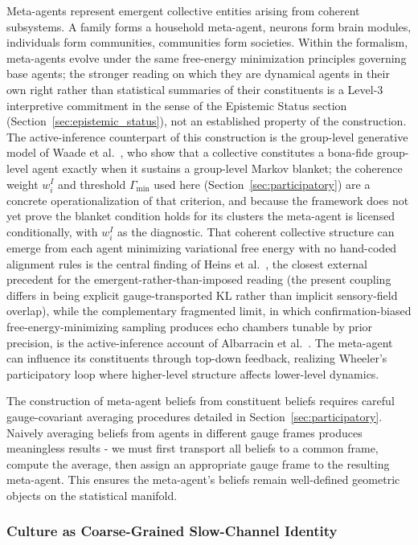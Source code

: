 \documentclass[11pt]{article}
\begin{document}
Meta-agents represent emergent collective entities arising from coherent subsystems. A family forms a household meta-agent, neurons form brain modules, individuals form communities, communities form societies. Within the formalism, meta-agents evolve under the same free-energy minimization principles governing base agents; the stronger reading on which they are dynamical agents in their own right rather than statistical summaries of their constituents is a Level-3 interpretive commitment in the sense of the Epistemic Status section (Section~\ref{sec:epistemic_status}), not an established property of the construction. The active-inference counterpart of this construction is the group-level generative model of Waade et al.~\cite{waade2025asone}, who show that a collective constitutes a bona-fide group-level agent exactly when it sustains a group-level Markov blanket; the coherence weight $w_i^I$ and threshold $\Gamma_{\min}$ used here (Section~\ref{sec:participatory}) are a concrete operationalization of that criterion, and because the framework does not yet prove the blanket condition holds for its clusters the meta-agent is licensed conditionally, with $w_i^I$ as the diagnostic. That coherent collective structure can emerge from each agent minimizing variational free energy with no hand-coded alignment rules is the central finding of Heins et al.~\cite{heins2024collective}, the closest external precedent for the emergent-rather-than-imposed reading (the present coupling differs in being explicit gauge-transported KL rather than implicit sensory-field overlap), while the complementary fragmented limit, in which confirmation-biased free-energy-minimizing sampling produces echo chambers tunable by prior precision, is the active-inference account of Albarracin et al.~\cite{albarracin2022epistemic}. The meta-agent can influence its constituents through top-down feedback, realizing Wheeler's participatory loop where higher-level structure affects lower-level dynamics.

The construction of meta-agent beliefs from constituent beliefs requires careful gauge-covariant averaging procedures detailed in Section~\ref{sec:participatory}. Naively averaging beliefs from agents in different gauge frames produces meaningless results - we must first transport all beliefs to a common frame, compute the average, then assign an appropriate gauge frame to the resulting meta-agent. This ensures the meta-agent's beliefs remain well-defined geometric objects on the statistical manifold.

\subsubsection{Culture as Coarse-Grained Slow-Channel Identity}
\label{sec:culture_rg}
\end{document}
